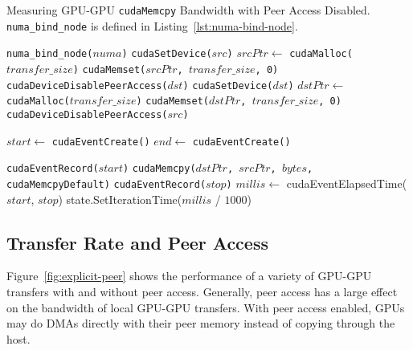 \begin{algorithm}[H]
	\caption[Measuring GPU-GPU \texttt{cudaMemcpy} Non-Peer Bandwidth]{
		Measuring GPU-GPU \texttt{cudaMemcpy} Bandwidth with Peer Access Disabled.
		\texttt{numa\_bind\_node} is defined in Listing~\ref{lst:numa-bind-node}.}
	\label{alg:explicit-gpu-gpu}
	\begin{algorithmic}[1]
		\Statex

		\State \texttt{numa\_bind\_node($numa$)}
		\State \texttt{cudaSetDevice($src$)}
		\State $srcPtr \gets$ \texttt{cudaMalloc($transfer\_size$)} 
		\State \texttt{cudaMemset($srcPtr$, $transfer\_size$, 0)}
		\State \texttt{cudaDeviceDisablePeerAccess($dst$)}
		\State \texttt{cudaSetDevice($dst$)}
		\State $dstPtr \gets$ \texttt{cudaMalloc($transfer\_size$)} 
		\State \texttt{cudaMemset($dstPtr$, $transfer\_size$, 0)}
		\State \texttt{cudaDeviceDisablePeerAccess($src$)}
		
		\State $start \gets$ \texttt{cudaEventCreate()}
		\State $end \gets$ \texttt{cudaEventCreate()}

		\State \texttt{cudaEventRecord($start$)}
		\State \texttt{cudaMemcpy($dstPtr$, $srcPtr$, $bytes$, cudaMemcpyDefault)}
		\State \texttt{cudaEventRecord($stop$)}
		\State $millis \gets$ cudaEventElapsedTime($start$, $stop$)
		\State state.SetIterationTime($millis$ / $1000$)
        \EndFor
		
		\EndFunction
		
	\end{algorithmic}
\end{algorithm}

\subsection{Transfer Rate and Peer Access}
\label{sec:explicit-peer-bandwidth}

Figure~\ref{fig:explicit-peer} shows the performance of a variety of GPU-GPU transfers with and without peer access.
Generally, peer access has a large effect on the bandwidth of local GPU-GPU transfers.
With peer access enabled, GPUs may do DMAs directly with their peer memory instead of copying through the host.

